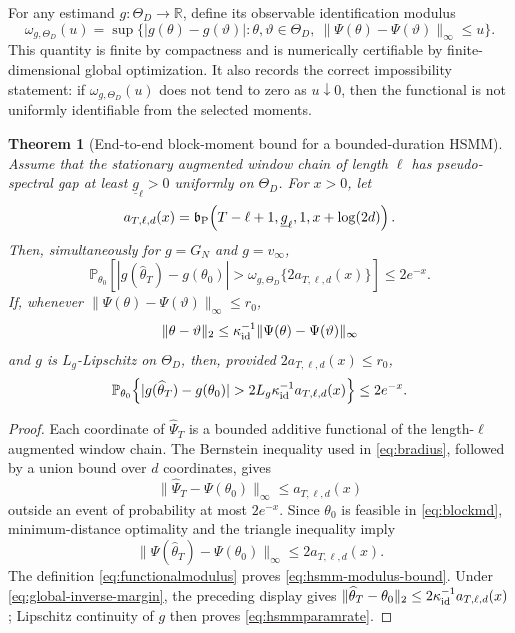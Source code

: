 \documentclass[11pt]{article}
\newtheorem{theorem}{Theorem}
\theoremstyle{definition}
\theoremstyle{remark}
\newcommand{\Pp}{\mathbb P}
\newcommand{\R}{\mathbb R}
\begin{document}
For any estimand $g:\Theta_D\to\R$, define its observable identification
modulus
\begin{equation}
 \omega_{g,\Theta_D}(u)=
 \sup\{|g(\theta)-g(\vartheta)|:
 \theta,\vartheta\in\Theta_D,\ 
 \|\Psi(\theta)-\Psi(\vartheta)\|_\infty\le u\}.
 \label{eq:functionalmodulus}
\end{equation}
This quantity is finite by compactness and is numerically certifiable by
finite-dimensional global optimization.  It also records the correct
impossibility statement: if $\omega_{g,\Theta_D}(u)$ does not tend to zero as
$u\downarrow0$, then the functional is not uniformly identifiable from the
selected moments.

\begin{theorem}[End-to-end block-moment bound for a bounded-duration HSMM]
\label{thm:hsmm-end-to-end}
Assume that the stationary augmented window chain of length $\ell$ has
pseudo-spectral gap at least $\underline g_\ell>0$ uniformly on $\Theta_D$.
For $x>0$, let
\begin{equation}
 a_{T,\ell,d}(x)=
 {\mathfrak b}_{\rm P}\!\left(
 T-\ell+1,\underline g_\ell,1,x+\log(2d)\right).
 \label{eq:blockradius}
\end{equation}
Then, simultaneously for $g=G_N$ and $g=v_\infty$,
\begin{equation}
 \Pp_{\theta_0}\!\left[
 |g(\widehat\theta_T)-g(\theta_0)|
 >
 \omega_{g,\Theta_D}\{2a_{T,\ell,d}(x)\}
 \right]\le 2e^{-x}.
 \label{eq:hsmm-modulus-bound}
\end{equation}
If, whenever $\|\Psi(\theta)-\Psi(\vartheta)\|_\infty\le r_0$,
\begin{equation}
 \|\theta-\vartheta\|_2
 \le\kappa_{\rm id}^{-1}
 \|\Psi(\theta)-\Psi(\vartheta)\|_\infty
 \label{eq:global-inverse-margin}
\end{equation}
and $g$ is $L_g$-Lipschitz on $\Theta_D$, then, provided
$2a_{T,\ell,d}(x)\le r_0$,
\begin{equation}
 \Pp_{\theta_0}\!\left\{
 |g(\widehat\theta_T)-g(\theta_0)|
 >2L_g\kappa_{\rm id}^{-1}a_{T,\ell,d}(x)
 \right\}\le2e^{-x}.
 \label{eq:hsmmparamrate}
\end{equation}
\end{theorem}

\begin{proof}
Each coordinate of $\widehat\Psi_T$ is a bounded additive functional of the
length-$\ell$ augmented window chain.  The Bernstein inequality used in
\eqref{eq:bradius}, followed by a union bound over $d$ coordinates, gives
\[
 \|\widehat\Psi_T-\Psi(\theta_0)\|_\infty
 \le a_{T,\ell,d}(x)
\]
outside an event of probability at most $2e^{-x}$.  Since $\theta_0$ is
feasible in \eqref{eq:blockmd}, minimum-distance optimality and the triangle
inequality imply
\[
 \|\Psi(\widehat\theta_T)-\Psi(\theta_0)\|_\infty
 \le2a_{T,\ell,d}(x).
\]
The definition \eqref{eq:functionalmodulus} proves
\eqref{eq:hsmm-modulus-bound}.  Under
\eqref{eq:global-inverse-margin}, the preceding display gives
$\|\widehat\theta_T-\theta_0\|_2
\le2\kappa_{\rm id}^{-1}a_{T,\ell,d}(x)$; Lipschitz continuity of $g$
then proves \eqref{eq:hsmmparamrate}.
\end{proof}
\end{document}
